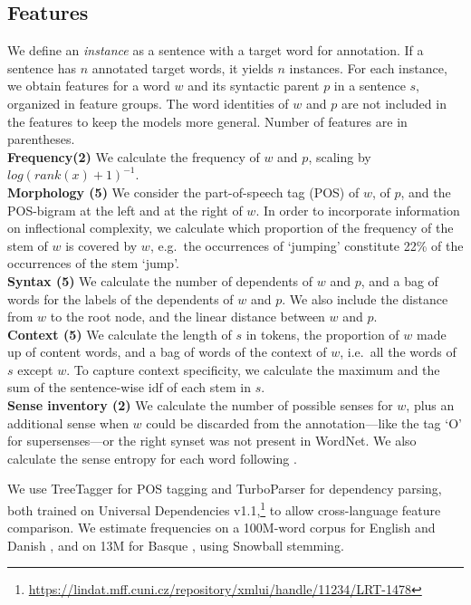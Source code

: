\documentclass[11pt,a4paper]{article}
\begin{document}
\subsection{Features}
We define an \textit{instance} as a sentence with a target word for annotation. If a sentence has $n$ annotated target words, it yields $n$ instances. For each instance, we obtain features for a word $w$ and its syntactic parent $p$ in a sentence $s$, organized in feature groups. The word identities of $w$ and $p$ are not included in the features to keep the models more general. Number of features are in parentheses.\\ 
\noindent\textbf{Frequency(2)} We calculate the frequency of $w$ and $p$, scaling by $log(rank(x)+1)^{-1}$.\\
\textbf{ Morphology (5)} We consider the part-of-speech tag (POS) of $w$, of $p$, and the POS-bigram at the left and at the right of $w$. In order to incorporate information on inflectional complexity, we calculate which proportion of the frequency of the stem of $w$ is covered by $w$, e.g.\ the occurrences of `jumping' constitute 22\% of the occurrences of the stem `jump'. \\
\textbf{Syntax (5)} We calculate the number of dependents of $w$ and $p$, and a bag of words for the labels of the dependents of $w$ and $p$. We also include the distance from $w$ to the root node, and the linear distance between $w$ and $p$.\\
\textbf{ Context  (5)} We calculate the length of $s$ in tokens, the proportion of $w$ made up of content words, and a bag of words of the context of $w$, i.e.\ all the words of $s$ except $w$. To capture context specificity, we calculate the maximum and the sum of the sentence-wise idf of each stem in $s$. \\
\textbf{Sense inventory (2)} We calculate the number of possible senses for $w$, plus an additional sense when $w$ could be discarded from the annotation---like the tag `O' for supersenses---or the right synset was not present in WordNet. We also calculate the sense entropy for each word following . 

 We use TreeTagger \cite{Schmid1994} for POS tagging and TurboParser \cite{Martins2010} for dependency parsing, both trained on Universal Dependencies v1.1,\footnote{\url{https://lindat.mff.cuni.cz/repository/xmlui/handle/11234/LRT-1478}} to allow cross-language feature comparison. %
 We estimate frequencies on a 100M-word corpus for English \cite{ferraresi2008introducing} and Danish \cite{Asmussen2012}, and on 13M for Basque \cite{leturia:2012}, using Snowball stemming.
\end{document}
